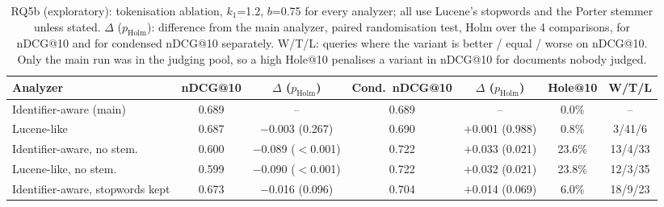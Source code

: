 \begin{table}[htb]
\centering
\small\setlength{\tabcolsep}{5pt}
\caption{RQ5b (exploratory): tokenisation ablation, $k_1$=1.2, $b$=0.75 for every analyzer; all use Lucene's stopwords and the Porter stemmer unless stated. $\Delta$ ($p_{\text{Holm}}$): difference from the main analyzer, paired randomisation test, Holm over the 4 comparisons, for nDCG@10 and for condensed nDCG@10 separately. W/T/L: queries where the variant is better / equal / worse on nDCG@10. Only the main run was in the judging pool, so a high Hole@10 penalises a variant in nDCG@10 for documents nobody judged.}
\label{tab:rq5tok}
\begin{tabular}{lcccccc}
\toprule
Analyzer & nDCG@10 & $\Delta$ ($p_{\text{Holm}}$) & Cond.\ nDCG@10 & $\Delta$ ($p_{\text{Holm}}$) & Hole@10 & W/T/L \\
\midrule
Identifier-aware (main) & 0.689 & -- & 0.689 & -- & 0.0\% & -- \\
Lucene-like & 0.687 & $-$0.003 (0.267) & 0.690 & $+$0.001 (0.988) & 0.8\% & 3/41/6 \\
Identifier-aware, no stem. & 0.600 & $-$0.089 ($<$0.001) & 0.722 & $+$0.033 (0.021) & 23.6\% & 13/4/33 \\
Lucene-like, no stem. & 0.599 & $-$0.090 ($<$0.001) & 0.722 & $+$0.032 (0.021) & 23.8\% & 12/3/35 \\
Identifier-aware, stopwords kept & 0.673 & $-$0.016 (0.096) & 0.704 & $+$0.014 (0.069) & 6.0\% & 18/9/23 \\
\bottomrule
\end{tabular}
\end{table}
